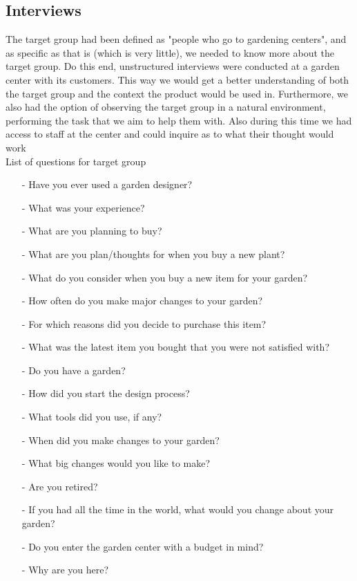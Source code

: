 		\subsection{Interviews}

		The target group had been defined as "people who go to gardening centers", and as specific as that is (which is very little), we needed to know more about the target group. Do this end, unstructured interviews were conducted at a garden center with its customers. This way we would get a better understanding of both the target group and the context the product would be used in. Furthermore, we also had the option of observing the target group in a natural environment, performing the task that we aim to help them with. Also during this time we had access to staff at the center and could inquire as to what their thought would work \\
		
		List of questions for target group
		\begin{itemize}
			\item[-] Have you ever used a garden designer?
			\item[-] What was your experience?
			\item[-] What are you planning to buy?
			\item[-] What are you plan/thoughts for when you buy a new plant?
			\item[-] What do you consider when you buy a new item for your garden?
			\item[-] How often do you make major changes to your garden?
			\item[-] For which reasons did you decide to purchase this item?
			\item[-] What was the latest item you bought that you were not satisfied with?
			\item[-] Do you have a garden?
			\item[-] How did you start the design process?
			\item[-] What tools did you use, if any?
			\item[-] When did you make changes to your garden?
			\item[-] What big changes would you like to make?
			\item[-] Are you retired?
			\item[-] If you had all the time in the world, what would you change about your garden?
			\item[-] Do you enter the garden center with a budget in mind?
			\item[-] Why are you here? \\
		\end{itemize}
		
